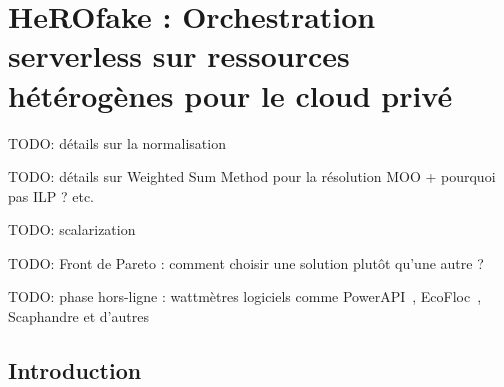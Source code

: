 \chapter{HeROfake : Orchestration serverless sur ressources hétérogènes pour le cloud privé}
\label{chapter:herofake}

TODO: détails sur la normalisation

TODO: détails sur Weighted Sum Method pour la résolution MOO + pourquoi pas ILP ? etc.

TODO: scalarization~\cite{ehrgottMulticriteriaOptimization882005}

TODO: Front de Pareto : comment choisir une solution plutôt qu'une autre ?

TODO: phase hors-ligne : wattmètres logiciels comme PowerAPI~\cite{fieniPowerAPIPythonFramework2024}, EcoFloc~\cite{valeraEnergySavingPerspective}, Scaphandre et d'autres~\cite{jayExperimentalComparisonSoftwarebased2023}

\section{Introduction}
\label{section:herofake-introduction}

